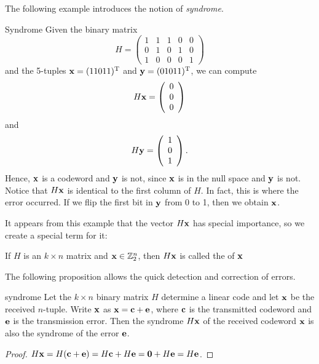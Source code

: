 The following example introduces the notion of \emph{syndrome}.
 
\begin{example}{Syndrome}
Given the binary matrix
\[
H =
\left(
\begin{array}{ccccc}
1 & 1 & 1 & 0 & 0 \\
0 & 1 & 0 & 1 & 0 \\
1 & 0 & 0 & 0 & 1
\end{array}
\right)
\]
and the 5-tuples ${\bold x} = (11011)^{\rm T}$ and ${\bold y} =
(01011)^{\rm T}$, we can compute
\[
H{\bold x} =
\left(
\begin{array}{c} 0 \\ 0 \\ 0 \end{array}
\right)
\]
and
\[
H{\bold y} =
\left(
\begin{array}{c} 1 \\ 0 \\ 1 \end{array}
\right).
\]
Hence, ${\bold x}$ is a codeword and ${\bold y}$ is not, since
${\bold x}$ is in the null space and ${\bold y}$ is not. Notice that
$H{\bold x}$ is identical to the first column of $H$. In fact, this is
where the error occurred. If we flip the first bit in ${\bold y}$ from
0 to 1, then we obtain ${\bold x}$.  
\end{example}
 
 It appears from this example that the vector $H{\bold x}$ has special importance, so we create a special term for it:
 
 \begin{defn}
If $H$ is an $k \times n$ matrix and ${\bold x} \in {\Bbb Z}_2^n$,
then $H{\bold x}$ is called the  of
${\bold x}$
\end{defn}

\noindent
The following proposition allows
the quick detection and correction of errors.
 
 \begin{prop}{syndrome}
Let the $k \times n$ binary matrix $H$ determine a linear code and let
${\bold x}$ be the received $n$-tuple. Write ${\bold x}$ as ${\bold x}
=  {\bold c} +{\bold e}$, where ${\bold c}$ is the transmitted codeword
and ${\bold e}$ is the transmission error. Then the syndrome  $H{\bold
x}$ of the received codeword ${\bold x}$ is also the syndrome
of the error ${\bold e}$.
\end{prop}
 
 \begin{proof}
$H{\bold x} = H({\bold c} +{\bold e}) = H{\bold c} + H{\bold e} =
{\bold 0} + H{\bold e} = H{\bold e}$.  
\end{proof}
 
